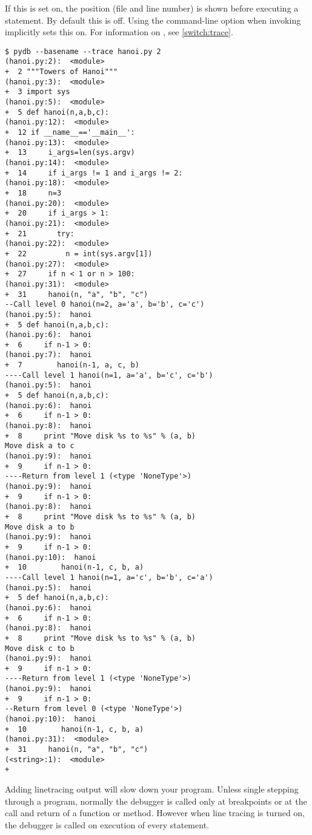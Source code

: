 \begin{description}
If this is set on, the position (file and line number) is shown before
executing a statement. By default this is off. Using the command-line
option  when invoking  implicitly sets this
on.  For information on , see \ref{switch:trace}.

\begin{verbatim}
$ pydb --basename --trace hanoi.py 2
(hanoi.py:2):  <module>
+  2 """Towers of Hanoi"""
(hanoi.py:3):  <module>
+  3 import sys
(hanoi.py:5):  <module>
+  5 def hanoi(n,a,b,c):
(hanoi.py:12):  <module>
+  12 if __name__=='__main__':
(hanoi.py:13):  <module>
+  13     i_args=len(sys.argv)
(hanoi.py:14):  <module>
+  14     if i_args != 1 and i_args != 2:
(hanoi.py:18):  <module>
+  18     n=3
(hanoi.py:20):  <module>
+  20     if i_args > 1:
(hanoi.py:21):  <module>
+  21       try: 
(hanoi.py:22):  <module>
+  22         n = int(sys.argv[1])
(hanoi.py:27):  <module>
+  27     if n < 1 or n > 100: 
(hanoi.py:31):  <module>
+  31     hanoi(n, "a", "b", "c")
--Call level 0 hanoi(n=2, a='a', b='b', c='c')
(hanoi.py:5):  hanoi
+  5 def hanoi(n,a,b,c):
(hanoi.py:6):  hanoi
+  6     if n-1 > 0:
(hanoi.py:7):  hanoi
+  7        hanoi(n-1, a, c, b) 
----Call level 1 hanoi(n=1, a='a', b='c', c='b')
(hanoi.py:5):  hanoi
+  5 def hanoi(n,a,b,c):
(hanoi.py:6):  hanoi
+  6     if n-1 > 0:
(hanoi.py:8):  hanoi
+  8     print "Move disk %s to %s" % (a, b)
Move disk a to c
(hanoi.py:9):  hanoi
+  9     if n-1 > 0:
----Return from level 1 (<type 'NoneType'>)
(hanoi.py:9):  hanoi
+  9     if n-1 > 0:
(hanoi.py:8):  hanoi
+  8     print "Move disk %s to %s" % (a, b)
Move disk a to b
(hanoi.py:9):  hanoi
+  9     if n-1 > 0:
(hanoi.py:10):  hanoi
+  10        hanoi(n-1, c, b, a) 
----Call level 1 hanoi(n=1, a='c', b='b', c='a')
(hanoi.py:5):  hanoi
+  5 def hanoi(n,a,b,c):
(hanoi.py:6):  hanoi
+  6     if n-1 > 0:
(hanoi.py:8):  hanoi
+  8     print "Move disk %s to %s" % (a, b)
Move disk c to b
(hanoi.py:9):  hanoi
+  9     if n-1 > 0:
----Return from level 1 (<type 'NoneType'>)
(hanoi.py:9):  hanoi
+  9     if n-1 > 0:
--Return from level 0 (<type 'NoneType'>)
(hanoi.py:10):  hanoi
+  10        hanoi(n-1, c, b, a) 
(hanoi.py:31):  <module>
+  31     hanoi(n, "a", "b", "c")
(<string>:1):  <module>
+ 
\end{verbatim}

Adding linetracing output will slow down your
program. Unless single stepping through a program, normally the
debugger is called only at breakpoints or at the call and return of a
function or method. However when line tracing is turned on, the
debugger is called on execution of every statement. 


\end{description}
